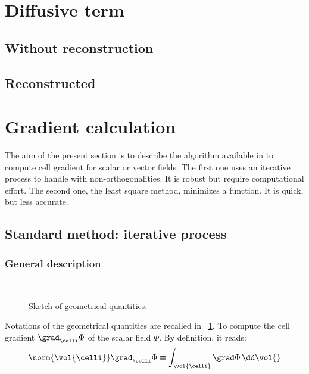 \section{Diffusive term}

\subsection{Without reconstruction}

\subsection{Reconstructed}



\section{Gradient calculation}

The aim of the present section is to describe the algorithm available in \CS 
to compute cell gradient for scalar or vector fields. The first one uses an 
iterative process to handle with non-orthogonalities. It is robust but require 
computational effort. The second one, the least square method, minimizes a 
function. It is quick, but less accurate.

\subsection{Standard method: iterative process}\label{sec:space_discretization_it_grad}


\subsubsection{General description}
\begin{figure}[!htbcp]
\centering
\mbox{
 \,
}
\caption{\label{fig:geom_gradrc}
Sketch of geometrical quantities.
}
\end{figure}

Notations of the geometrical quantities are recalled in \figurename~\ref{fig:geom_gradrc}.
To compute the cell gradient $\grad_{\celli} \Phi $ of the scalar field $\Phi$.
By definition, it reads:
\begin{equation}
\norm{\vol{\celli}} \grad_{\celli} \Phi
\equiv  \displaystyle
\int_{\vol{\celli}}{\grad \Phi \, \dd \vol{} }
\end{equation}



